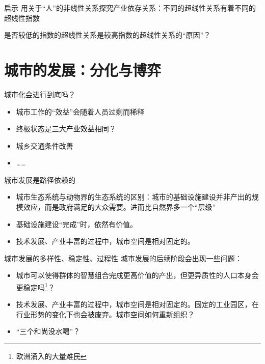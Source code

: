 \documentclass[utf8]{ctexbeamer}
\begin{document}
\begin{frame}{启示}
    用关于“人”的非线性关系探究产业依存关系：不同的超线性关系有着不同的超线性指数
    
    \vspace{0.5cm}
    是否较低的指数的超线性关系是较高指数的超线性关系的“原因”？
\end{frame}

\section{城市的发展：分化与博弈}

\begin{frame}{城市化会进行到底吗？}
    \begin{itemize}
        \item 城市工作的“效益”会随着人员过剩而稀释
        \item 终极状态是三大产业效益相同？
        \item 城乡交通条件改善
        \item ……
    \end{itemize}
\end{frame}

\begin{frame}{城市发展是路径依赖的}
    \begin{itemize}
        \item 城市生态系统与动物界的生态系统的区别：城市的基础设施建设并非产出的规模效应，而是政府满足的大众需要。进而比自然界多一个“层级”
        \item 基础设施建设“完成”时，依然有价值。
        \item 技术发展、产业丰富的过程中，城市空间是相对固定的。
    \end{itemize}
\end{frame}

\begin{frame}{城市发展的多样性、稳定性、过程性}
    城市发展的后续阶段会出现一些问题：
    \begin{itemize}
        \item 城市可以使得群体的智慧组合完成更高价值的产出，但更异质性的人口本身会更稳定吗\footnote{欧洲涌入的大量难民}？
        \item 技术发展、产业丰富的过程中，城市空间是相对固定的。固定的工业园区，在行业形势的变化下也会被废弃。城市空间如何重新组织？
        \item “三个和尚没水喝”？
    \end{itemize}
\end{frame}
\end{document}
